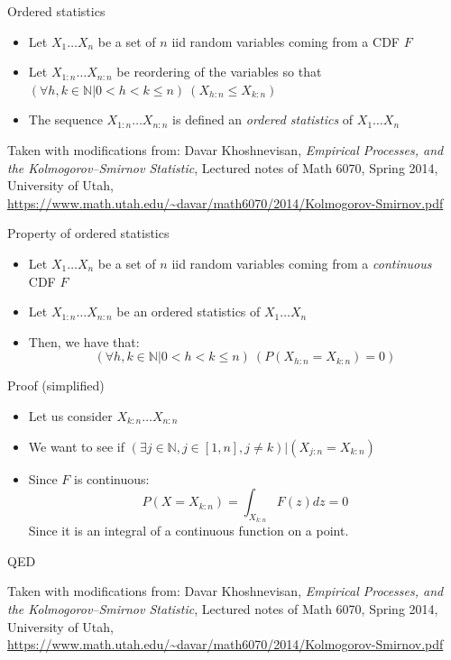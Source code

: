 \documentclass{beamer}
\begin{document}
\begin{frame}
{\centerline{Ordered statistics}}

\begin{itemize}
    \item Let $X_1 \ldots X_n$ be a set of $n$ iid random variables coming from a CDF $F$
    \item Let $X_{1:n} \ldots X_{n:n}$ be reordering of the variables so that $(\forall h, k \in \mathbb{N} | 0 < h < k \leq n) ~ (X_{h:n} \leq X_{k:n})$
    \item The sequence $X_{1:n} \ldots X_{n:n}$  is defined an \textit{ordered statistics} of $X_1 \ldots X_n$
\end{itemize}


\begin{center}
\tiny{Taken with modifications from: Davar Khoshnevisan, \textit{Empirical Processes, and the Kolmogorov–Smirnov Statistic}, Lectured notes of Math 6070, Spring 2014, University of Utah, \url{https://www.math.utah.edu/~davar/math6070/2014/Kolmogorov-Smirnov.pdf}}
\end{center}

\end{frame}

\begin{frame}
{\centerline{Property of ordered statistics}}

\begin{itemize}
    \item Let $X_1 \ldots X_n$ be a set of $n$ iid random variables coming from a \textit{continuous} CDF $F$
    \item Let $X_{1:n} \ldots X_{n:n}$ be an ordered statistics of $X_1 \ldots X_n$
    \item Then, we have that:
     $$(\forall h, k \in \mathbb{N} | 0 < h < k \leq n) ~ (P(X_{h:n} = X_{k:n}) = 0)$$
\end{itemize}
Proof (simplified)
\begin{itemize}
    \item Let us consider $X_{k:n} \ldots X_{n:n}$ 
    \item We want to see if $(\exists j \in \mathbb{N}, j \in [1,n], j \neq k) | (X_{j:n} = X_{k:n})$
    \item Since $F$ is continuous:
    	$$P(X = X_{k:n}) = \int_{X_{k:n}} F(z)dz = 0$$
    Since it is an integral of a continuous function on a point.
\end{itemize}
QED



\begin{center}
\tiny{Taken with modifications from: Davar Khoshnevisan, \textit{Empirical Processes, and the Kolmogorov–Smirnov Statistic}, Lectured notes of Math 6070, Spring 2014, University of Utah, \url{https://www.math.utah.edu/~davar/math6070/2014/Kolmogorov-Smirnov.pdf}}
\end{center}

\end{frame}
\end{document}
